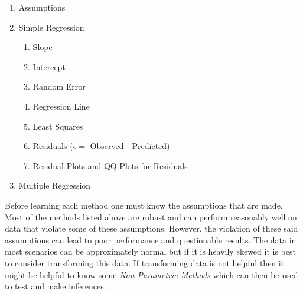 \documentclass[11pt]{article}
\begin{document}
\begin{enumerate}
\begin{enumerate}
			\item Assumptions
			\item Simple Regression
			\begin{enumerate}
				\item Slope
				\item Intercept
				\item Random Error
				\item Regression Line
				\item Least Squares
				\item Residuals ($\epsilon = $ Observed - Predicted)
				\item Residual Plots and QQ-Plots for Residuals
			\end{enumerate}
			\item Multiple Regression
		\end{enumerate}
	\end{enumerate}
	Before learning each method one must know the assumptions that are made. Most of the methods listed above are robust and can perform reasonably well on data that violate some of these assumptions. However, the violation of these said assumptions can lead to poor performance and questionable results. The data in most scenarios can be approximately normal but if it is heavily skewed it is best to consider transforming this data. If transforming data is not helpful then it might be helpful to know some \textit{Non-Parametric Methods} which can then be used to test and make inferences.
\end{document}
